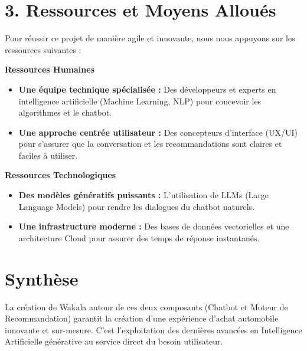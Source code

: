 \documentclass[a4paper, 11pt]{article}
\begin{document}
\section*{3. Ressources et Moyens Alloués}
Pour réussir ce projet de manière agile et innovante, nous nous appuyons sur les ressources suivantes :

\vspace{0.2cm}
\textbf{Ressources Humaines}
\begin{itemize}[label=\textbullet]
    \item \textbf{Une équipe technique spécialisée :} Des développeurs et experts en intelligence artificielle (Machine Learning, NLP) pour concevoir les algorithmes et le chatbot.
    \item \textbf{Une approche centrée utilisateur :} Des concepteurs d'interface (UX/UI) pour s'assurer que la conversation et les recommandations sont claires et faciles à utiliser.
\end{itemize}

\textbf{Ressources Technologiques}
\begin{itemize}[label=\textbullet]
    \item \textbf{Des modèles génératifs puissants :} L'utilisation de LLMs (Large Language Models) pour rendre les dialogues du chatbot naturels.
    \item \textbf{Une infrastructure moderne :} Des bases de données vectorielles et une architecture Cloud pour assurer des temps de réponse instantanés.
\end{itemize}

\vspace{0.3cm}

\section*{Synthèse}
La création de Wakala autour de ces deux composants (Chatbot et Moteur de Recommandation) garantit la création d'une expérience d'achat automobile innovante et sur-mesure. C'est l'exploitation des dernières avancées en Intelligence Artificielle générative au service direct du besoin utilisateur.
\end{document}
